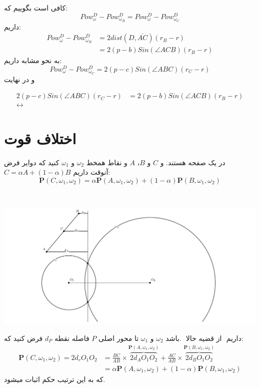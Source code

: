 \documentclass{article}
\begin{document}
کافی است بگوییم که:
\[Pow_{\omega}^D-Pow_{\omega_B}^D=Pow_{\omega}^D-Pow_{\omega_C}^D\]
داریم:
\begin{align*}
Pow_{\omega}^D-Pow_{\omega_B}^D&=2 dist(D,\overline{AC}) (r_B-r) \\
&= 2 (p-b) Sin(\angle{ACB}) (r_B-r)
\end{align*}
به نحو مشابه داریم:
\[Pow_{\omega}^D-Pow_{\omega_C}^D=2 (p-c) Sin(\angle{ABC}) (r_C-r)\]
و در نهایت

\begin{align*}
2 (p-c) Sin(\angle{ABC}) (r_C-r)&=2 (p-b)Sin(\angle{ACB}) (r_B-r)\\
\longleftrightarrow
\end{align*}

\section{اختلاف قوت}
\begin{theo}{}{}

‏فرض‎ کنید که دوایر ‎‎$‎\omega_1‎$‎ ‏و ‎‎$‎\omega_2‎$‎ و نقاط همخط ‎‎$‎A‎$ ‎‏‏‏،‎‎$‎B‎$ و ‎$‎‎‎‎‏‎C‎$‎‎‎‎ ‏در یک صفحه هستند. و ‎‎$‎C=\alpha ‎A+(1-\alpha)B‎$‎‎ ‏آنوقت داریم:
‎‎\[‎‎\mathbf{P}(C,\omega_1,\omega_2)=\alpha ‎‎\mathbf{P}(A,\omega_1,\omega_2)+(1-\alpha)‎‎\mathbf{P}(B,\omega_1,\omega_2)‎‎\]
\end{theo}

‎

\includegraphics[scale=0.6]{dif.pdf}

فرض کنید که ‎$d_P‎$‎‎ ‏فاصله نقطه ‎$‎P‎$‎‎‎‎ ‏تا محور اصلی ‎‎$‎\omega_1‎$‎ ‏‎‎‏و ‎‎$‎\omega_2‎$‎ ‏باشد. ‎
‏حالا‎‎‎ از قضیه ‎‎ ‏داریم:
\begin{align*}‎‎
\mathbf{P}(C,\omega_1,\omega_2)=2d_cO_1O_2&=\frac{BC}{AB} ‎\times ‎\overbrace{2 d_A O_1O_2}^{‎‎\mathbf{P}(A,\omega_1,\omega_2)}‎+‎‎\frac{AC}{AB} ‎\times ‎\overbrace{2 d_B O_1O_2}^{‎‎\mathbf{P}(B,\omega_1,\omega_2)}‎\\‎
&= ‎\alpha‎ ‎‎\mathbf{P}(A,\omega_1,\omega_2)+(1-\alpha) ‎‎\mathbf{P}(B,\omega_1,\omega_2)
\end{align*}
که به این ترتیب حکم اثبات میشود.\blacksquare
\end{document}
